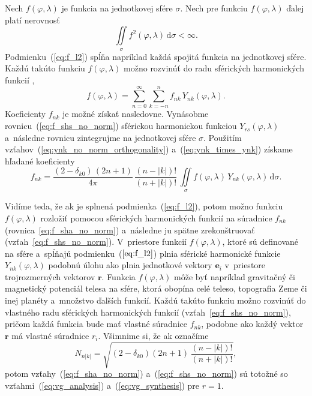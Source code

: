 \documentclass[a4paper,12pt]{book}
\newcommand{\diff}{\mathrm d}
\let\vec\mathbf
\begin{document}
Nech $f(\varphi, \lambda)$ je funkcia na jednotkovej sfére $\sigma$.  Nech pre
funkciu $f(\varphi, \lambda)$ ďalej platí nerovnosť
%
\begin{equation}
\label{eq:f_l2}
\iint\limits_\sigma f^2(\varphi, \lambda) \, \diff \sigma < \infty{.}
\end{equation}
%
Podmienku~(\ref{eq:f_l2}) spĺňa napríklad každá spojitá funkcia na jednotkovej
sfére.  Každú takúto funkciu $f(\varphi, \lambda)$ možno rozvinúť do radu
sférických harmonických funkcií \parencite[napríklad][]{MoritzPhysicalGeodesy},
%
\begin{equation}
\label{eq:f_shs_no_norm}
f(\varphi, \lambda) = \sum_{n = 0}^\infty \sum_{k = -n}^n f_{nk} \,
Y_{nk}(\varphi, \lambda){.}
\end{equation}
%
Koeficienty $f_{nk}$ je možné získať nasledovne.  Vynásobme 
rovnicu~(\ref{eq:f_shs_no_norm}) sférickou harmonickou funkciou 
$Y_{rs}(\varphi, \lambda)$ a~následne rovnicu zintegrujme na jednotkovej sfére 
$\sigma$.  Použitím vzťahov~(\ref{eq:ynk_no_norm_orthogonality}) 
a~(\ref{eq:ynk_times_ynk}) získame hľadané koeficienty
%
\begin{equation}
\label{eq:f_sha_no_norm}
f_{nk} = \frac{(2 - \delta_{k0}) \, (2n + 1)}{4\pi} \, \frac{(n - |k|)!}{(n 
+ |k|)!} \, \iint\limits_{\sigma} f(\varphi, \lambda) \, Y_{nk}(\varphi, 
\lambda) \, \diff \sigma{.}
\end{equation}
%

Vidíme teda, že ak je splnená podmienka~(\ref{eq:f_l2}), potom možno 
funkciu~$f(\varphi, \lambda)$ rozložiť pomocou sférických harmonických funkcií 
na súradnice $f_{nk}$ (rovnica~\ref{eq:f_sha_no_norm}) a~následne ju spätne 
zrekonštruovať (vzťah~\ref{eq:f_shs_no_norm}).  V~priestore funkcií $f(\varphi, 
\lambda)$, ktoré sú definované na sfére a~spĺňajú podmienku~($\ref{eq:f_l2}$) 
plnia sférické harmonické funkcie $Y_{nk}(\varphi, \lambda)$ podobnú úlohu ako 
plnia jednotkové vektory $\vec e_i$ v~priestore trojrozmerných vektorov $\vec 
r$.  Funkcia $f(\varphi,\lambda)$ môže byť napríklad gravitačný či magnetický 
potenciál telesa na sfére, ktorá obopína celé teleso, topografia Zeme či inej 
planéty a~množstvo ďalších funkcií.  Každú takúto funkciu možno rozvinúť do 
vlastného radu sférických harmonických funkcií (vzťah~\ref{eq:f_shs_no_norm}), 
pričom každá funkcia bude mať vlastné súradnice $f_{nk}$, podobne ako každý 
vektor $\vec r$ má vlastné súradnice $r_i$.  Všimnime si, že ak označíme
%
\begin{equation}
\label{eq:sh_norm}
N_{n|k|} = \sqrt{(2 - \delta_{k0}) (2n + 1) \, \frac{(n - |k|)!}{(n
+ |k|)!}}{,}
\end{equation}
%
potom vzťahy~(\ref{eq:f_sha_no_norm}) a~(\ref{eq:f_shs_no_norm}) sú totožné so
vzťahmi~(\ref{eq:vg_analysis}) a~(\ref{eq:vg_synthesis}) pre $r = 1$.
\end{document}
